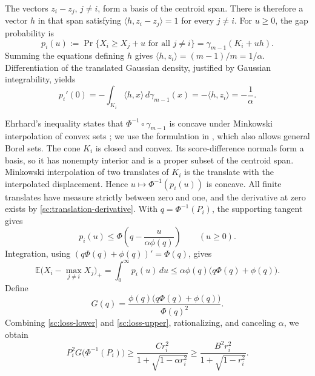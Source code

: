The vectors \(z_i-z_j\), \(j\ne i\), form a basis of the centroid
span. There is therefore a vector \(h\) in that span satisfying
\(\langle h,z_i-z_j\rangle=1\) for every \(j\ne i\).
For \(u\ge0\), the gap probability is
\[
 p_i(u):=\Pr\{X_i\ge X_j+u\text{ for all }j\ne i\}
       =\gamma_{m-1}(K_i+uh).
\]
Summing the equations defining \(h\) gives
\(\langle h,z_i\rangle=(m-1)/m=1/\alpha\).
Differentiation of the translated Gaussian density, justified by
Gaussian integrability, yields
\begin{equation}\label{sc:translation-derivative}
 p_i'(0)=-\int_{K_i}\langle h,x\rangle\,d\gamma_{m-1}(x)
        =-\langle h,z_i\rangle=-\frac1\alpha.
\end{equation}

Ehrhard's inequality states that \(\Phi^{-1}\circ\gamma_{m-1}\) is
concave under Minkowski interpolation of convex sets
\cite{Ehrhard}; we use the formulation in
\cite[Theorem~1.1]{Borell}, which also allows general Borel sets.
The cone \(K_i\) is closed and convex. Its score-difference normals
form a basis, so it has nonempty interior and is a proper subset of
the centroid span. Minkowski interpolation of two translates of \(K_i\) is the translate
with the interpolated displacement. Hence
\(u\mapsto\Phi^{-1}(p_i(u))\) is concave. All finite translates
have measure strictly between zero and one, and the derivative at
zero exists by \eqref{sc:translation-derivative}. With
\(q=\Phi^{-1}(P_i)\), the supporting tangent gives
\[
 p_i(u)\le\Phi\!\left(q-\frac{u}{\alpha\phi(q)}\right)
 \qquad(u\ge0).
\]
Integration, using \((q\Phi(q)+\phi(q))'=\Phi(q)\), gives
\begin{equation}\label{sc:loss-upper}
 \mathbb E\bigl(X_i-\max_{j\ne i}X_j\bigr)_+
 =\int_0^\infty p_i(u)\,du
 \le\alpha\phi(q)\bigl(q\Phi(q)+\phi(q)\bigr).
\end{equation}
Define
\[
 G(q)=\frac{\phi(q)\bigl(q\Phi(q)+\phi(q)\bigr)}{\Phi(q)^2}.
\]
Combining \eqref{sc:loss-lower} and \eqref{sc:loss-upper}, rationalizing,
and canceling \(\alpha\), we obtain
\begin{equation}\label{sc:loss-constraint}
 P_i^2G\bigl(\Phi^{-1}(P_i)\bigr)
 \ge\frac{Cr_i^2}{1+\sqrt{1-\alpha r_i^2}}
 \ge\frac{B^2r_i^2}{1+\sqrt{1-r_i^2}}.
\end{equation}


